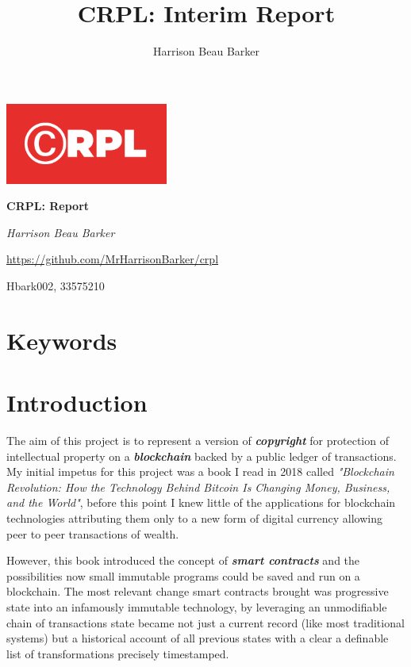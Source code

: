 \documentclass[12pt]{article}
\title{CRPL: Interim Report}
\author{Harrison Beau Barker}
\newcommand{\keyword}[1]{\textbf{\textit{#1}}}
\begin{document}
\begin{titlepage}
	\centering
	\includegraphics[width=0.4\textwidth]{crpl}\par
	\vspace{1cm}
	{\huge\bfseries CRPL: Report\par}
	\vspace{2cm}
	{\Large\itshape Harrison Beau Barker\par}
	\vfill
	{\url{https://github.com/MrHarrisonBarker/crpl}\par}
	\vspace{1cm}
	{\large Hbark002, 33575210\par}
\end{titlepage}


\tableofcontents{}

\section{Keywords}

\section{Introduction}

The aim of this project is to represent a version of \keyword{copyright} for protection of intellectual property on a \keyword{blockchain} backed by a public ledger of transactions. My initial impetus for this project was a book I read in 2018 called \textit{"Blockchain Revolution: How the Technology Behind Bitcoin Is Changing Money, Business, and the World"}\cite{blockchain_revolution}, before this point I knew little of the applications for blockchain technologies attributing them only to a new form of digital currency allowing peer to peer transactions of wealth.

However, this book introduced the concept of \keyword{smart contracts} and the possibilities now small immutable programs could be saved and run on a blockchain. The most relevant change smart contracts brought was progressive state into an infamously immutable technology, by leveraging an unmodifiable chain of transactions state became not just a current record (like most traditional systems) but a historical account of all previous states with a clear a definable list of transformations precisely timestamped.
\end{document}
